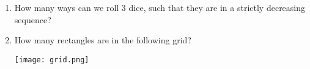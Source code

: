 
\begin{enumerate}
\item How many ways can we roll 3 dice, such that they are in a strictly decreasing sequence? 


\vspace{5cm}

\item How many rectangles are in the following grid? 
\begin{center}
\texttt{[image: grid.png]}
\end{center}
\

\end{enumerate}
